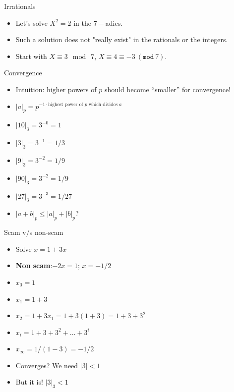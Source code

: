 \documentclass[8pt]{beamer}
\renewcommand{\mod}[1]{\left( \texttt{mod}~#1 \right)}
\begin{document}
\begin{frame}{Irrationals}
\begin{itemize}
\item Let's solve $X^2 = 2$ in the $7-$adics. \pause
\item Such a solution does not "really exist" in the rationals or the integers.\pause
\item Start with $X \equiv 3 \mod~{7}$, $X \equiv 4 \equiv -3~\mod{7}$.
\end{itemize}
\end{frame}


\begin{frame}{Convergence}
\begin{itemize}
\item Intuition: higher powers of $p$ should become ``smaller'' for convergence! \pause
\item $|a|_p = p^{-1 \cdot \text{highest power of } p \text { which divides } a}$\pause
\item $|10|_3 = 3^{-0} = 1$\pause
\item $|3|_3 = 3^{-1} = 1/3$\pause
\item $|9|_3 = 3^{-2} = 1/9$\pause
\item $|90|_3 = 3^{-2} = 1/9$\pause
\item $|27|_3 = 3^{-3} = 1/27$\pause
\item $|a + b|_p \leq |a|_p + |b|_p$? \pause
\end{itemize}
\end{frame}

\begin{frame}{Scam v/s non-scam}
\begin{itemize}
\item Solve $x = 1 + 3x$\pause
\item \textbf{Non scam}:$-2x = 1$\pause; $x = -1/2$
\item $x_0 = 1$\pause
\item $x_1 = 1 + 3$
\item $x_2 = 1 + 3x_1 = 1 + 3(1 + 3) = 1 + 3 + 3^2$\pause
\item $x_i = 1 + 3 + 3^2 + \dots + 3^i$\pause
\item $x_\infty = 1/(1-3) = -1/2$
\item Converges? We need $|3| < 1$\pause
\item But it is! $|3|_3 < 1$\pause
\end{itemize}
\end{frame}
\end{document}
